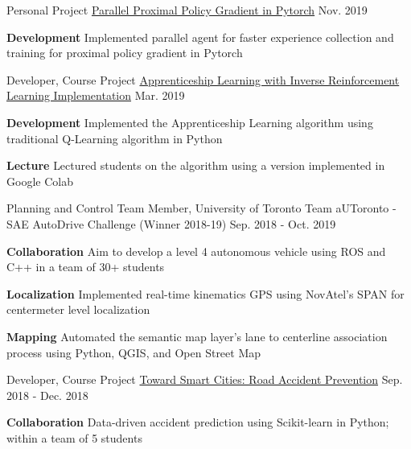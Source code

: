 \begin{cventries}
	\cventry
	{Personal Project}
	{\href{https://github.com/rhklite/Parallel-PPO-PyTorch}{Parallel Proximal Policy Gradient in Pytorch}}
	{Nov. 2019}
	{}
	{
		\begin{cvitems}
			\item {\textbf{Development} Implemented parallel agent for faster experience collection and training for proximal policy gradient in Pytorch}
		\end{cvitems}
	}
	\cventry
	{Developer, Course Project}
	{\href{https://github.com/rhklite/apprenticeship_inverse_RL}{Apprenticeship Learning with Inverse Reinforcement Learning Implementation}}
	{Mar. 2019}
	{}
	{
		\begin{cvitems}
			\item {\textbf{Development} {Implemented the Apprenticeship Learning algorithm using traditional Q-Learning algorithm in Python}}
			\item {\textbf{Lecture} {Lectured students on the algorithm using a version implemented in Google Colab}}
		\end{cvitems}
	}
	\cventry
	{Planning and Control Team Member, University of Toronto Team}
	{aUToronto - SAE AutoDrive Challenge (Winner 2018-19)}
	{Sep. 2018 - Oct. 2019}
	{}
	{
		\begin{cvitems}
			\item {\textbf{Collaboration} Aim to develop a level 4 autonomous vehicle using ROS and C++ in a team of 30+ students}
			\item {\textbf{Localization} Implemented real-time kinematics GPS using NovAtel's SPAN for centermeter level localization
			}
			\item {\textbf{Mapping} Automated the semantic map layer's lane to centerline association process using Python, QGIS, and Open Street Map}
		\end{cvitems}
	}
	\cventry
	{Developer, Course Project}
	{\href{https://github.com/rhklite/traffic_accident_prediction}{Toward Smart Cities: Road Accident Prevention}}
	{Sep. 2018 - Dec. 2018}
	{}
	{
		\begin{cvitems}
			\item {\textbf{Collaboration} Data-driven accident prediction using Scikit-learn in Python; within a team of 5 students}

\end{cvitems}}
\end{cventries}
